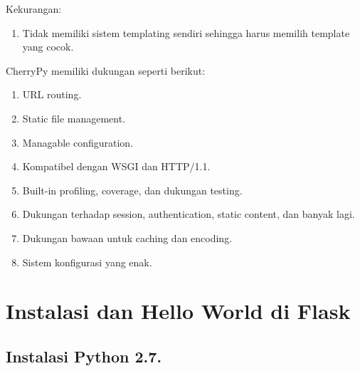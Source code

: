 Kekurangan:
\begin{enumerate}
\item Tidak memiliki sistem templating sendiri sehingga harus memilih template yang cocok.
\end{enumerate}

CherryPy memiliki dukungan seperti berikut:
\begin{enumerate}
\item URL routing.
\item Static file management.
\item Managable configuration.
\item Kompatibel dengan WSGI dan HTTP/1.1.
\item Built-in profiling, coverage, dan dukungan testing.
\item Dukungan terhadap session, authentication, static content, dan banyak lagi.
\item Dukungan bawaan untuk caching dan encoding.
\item Sistem konfigurasi yang enak.
\end{enumerate}

\section{Instalasi dan Hello World di Flask}

\subsection{Instalasi Python 2.7.}

